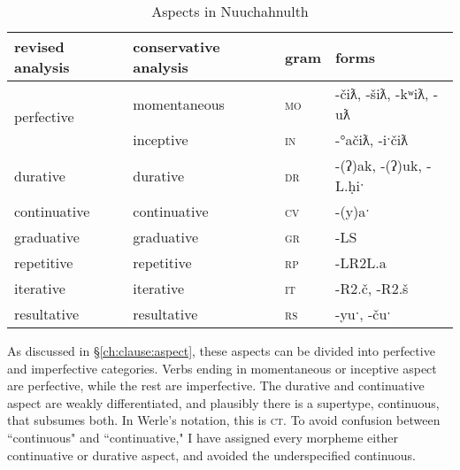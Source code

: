 \begin{table}[ht]
\centering
\caption{Aspects in Nuuchahnulth}
\label{table:aspects}
\begin{tabular}{llll}
revised analysis & conservative analysis & gram                    & forms                                                         \\ \hline
\multicolumn{1}{|l|}{\multirow{2}{*}{perfective}}   & \multicolumn{1}{l|}{momentaneous} & \multicolumn{1}{l|}{\textsc{mo}} & \multicolumn{1}{l|}{-čiƛ, -šiƛ, -kʷiƛ, -uƛ}                 \\ \cline{2-4} 
\multicolumn{1}{|l|}{}                            & \multicolumn{1}{l|}{inceptive}    & \multicolumn{1}{l|}{\textsc{in}} & \multicolumn{1}{l|}{-°ačiƛ, -iˑčiƛ}                         \\ \hline
\multicolumn{1}{|l|}{durative}                    & \multicolumn{1}{l|}{durative}     & \multicolumn{1}{l|}{\textsc{dr}} & \multicolumn{1}{l|}{-(ʔ)ak, -(ʔ)uk, -L.ḥiˑ}  \\ \hline
\multicolumn{1}{|l|}{continuative}                & \multicolumn{1}{l|}{continuative} & \multicolumn{1}{l|}{\textsc{cv}} & \multicolumn{1}{l|}{-(y)aˑ}                   \\ \hline
\multicolumn{1}{|l|}{graduative}                     & \multicolumn{1}{l|}{graduative}   & \multicolumn{1}{l|}{\textsc{gr}} & \multicolumn{1}{l|}{-LS}                        \\ \hline
\multicolumn{1}{|l|}{repetitive}                  & \multicolumn{1}{l|}{repetitive}   & \multicolumn{1}{l|}{\textsc{rp}} & \multicolumn{1}{l|}{-LR2L.a}                   \\ \hline
\multicolumn{1}{|l|}{iterative}                  & \multicolumn{1}{l|}{iterative}    & \multicolumn{1}{l|}{\textsc{it}} & \multicolumn{1}{l|}{-R2.č, -R2.š} \\ \hline \hline
\multicolumn{1}{|l|}{resultative}                 & \multicolumn{1}{l|}{resultative}  & \multicolumn{1}{l|}{\textsc{rs}} & \multicolumn{1}{l|}{-yuˑ, -čuˑ}              \\ \hline
\end{tabular}
\end{table}

As discussed in \S\ref{ch:clause:aspect}, these aspects can be divided into perfective and imperfective categories. Verbs ending in momentaneous or inceptive aspect are perfective, while the rest are imperfective. The durative and continuative aspect are weakly differentiated, and plausibly there is a supertype, continuous, that subsumes both. In Werle's notation, this is \textsc{ct}. To avoid confusion between ``continuous" and ``continuative," I have assigned every morpheme either continuative or durative aspect, and avoided the underspecified continuous.


